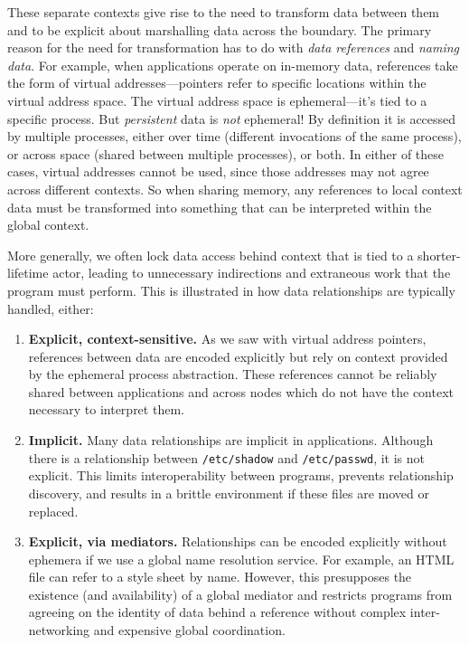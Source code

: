 These separate contexts give rise to the need to transform data between them and to be explicit about marshalling data
across the boundary. The primary reason for the need for transformation has to do with \emph{data references} and
\emph{naming data}. For example, when applications operate on in-memory data, references take the form of virtual
addresses---pointers refer to specific locations within the virtual address space. The virtual address space is
ephemeral---it's tied to a specific process. But \emph{persistent} data is \emph{not} ephemeral! By definition it is
accessed by multiple processes, either over time (different invocations of the same process), or across space (shared
between multiple processes), or both. In either of these cases, virtual addresses cannot be used, since those addresses
may not agree across different contexts. So when sharing memory, any references to local context data must be
transformed into something that can be interpreted within the global context.

More generally, we often lock data access behind context that is tied to a shorter-lifetime actor, leading to
unnecessary indirections and extraneous work that the program must perform.
This is illustrated in how data relationships are typically handled, either:
\begin{enumerate}
    \item \textbf{Explicit, context-sensitive.} As we saw with virtual address pointers,
          references between data are encoded explicitly but rely on context provided by
          the ephemeral process abstraction. These references cannot be reliably shared between
          applications and across nodes which do not have the context necessary to interpret them.
    \item \textbf{Implicit.} Many data relationships are implicit in applications.
          Although there is a relationship between \texttt{/etc/shadow} and \texttt{/etc/passwd},
          it is not explicit. This limits interoperability between programs, prevents
          relationship discovery, and results in a brittle environment if these files are
          moved or replaced.
    \item \textbf{Explicit, via mediators.} Relationships can be encoded explicitly without
          ephemera if we use a global name resolution service. For example, an HTML
          file can refer to a style sheet by name. However, this presupposes the existence (and
          availability) of a global mediator and restricts programs from agreeing on the identity
          of data behind a reference without complex inter-networking and expensive global coordination.
\end{enumerate}

